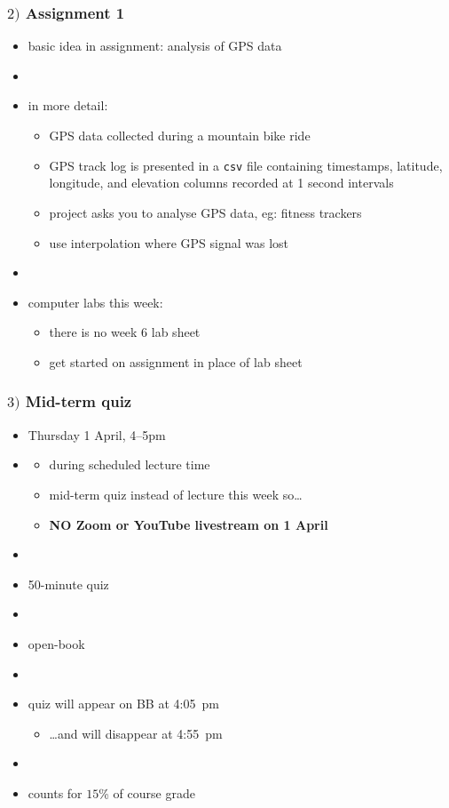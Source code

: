 \documentclass[english,14pt]{beamer}
\begin{document}
\begin{frame}[fragile]

\frametitle{$2)$ Assignment 1}

\begin{itemize}
	\item basic idea in assignment: analysis of GPS data
	\item[]
	\item in more detail:
	\begin{itemize}
		\item GPS data collected during a mountain bike ride
		\item GPS track log is presented in a \texttt{csv} file containing timestamps, latitude, longitude, and elevation
columns recorded at 1 second intervals
		\item project asks you to analyse GPS data, eg: fitness trackers
		\item use interpolation where GPS signal was lost
	\end{itemize}
	\item[]
	\item computer labs this week:
	\begin{itemize}
		\item there is no week 6 lab sheet
		\item get started on assignment in place of lab sheet
	\end{itemize}
\end{itemize}

\end{frame}


\begin{frame}[fragile]

\frametitle{$3)$ Mid-term quiz}

\begin{itemize}
	\item Thursday 1 April, 4--5pm
	\item[]
	\begin{itemize}
		\item during scheduled lecture time
		\item mid-term quiz instead of lecture this week so\ldots
		\item \textbf{NO Zoom or YouTube livestream on 1 April}
	\end{itemize}
	\item[]
	\item 50-minute quiz
	\item[]
	\item open-book
	\item[]
	\item quiz will appear on BB at 4:05~pm
	\begin{itemize}
		\item[] \ldots and will disappear at 4:55~pm
	\end{itemize}
	\item[]
	\item counts for $15$\% of course grade

\end{itemize}

\end{frame}
\end{document}
